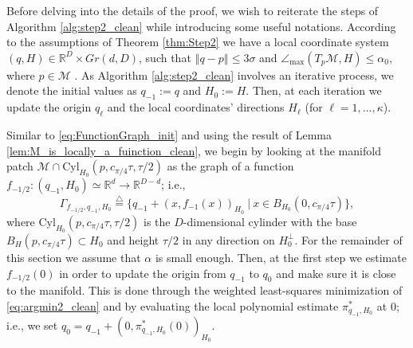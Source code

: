 \documentclass[12pt]{article}
\theoremstyle{remark}
\newcommand{\RR}{\mathbb{R}}
\newcommand{\MM}{\mathcal{M}}
\newcommand{\defeq}{\stackrel{\bigtriangleup}{=}}
\newcommand{\norm}[1]{\left\Vert #1 \right\Vert}
\begin{document}
\begin{figure}[omitted: a diagram of this paper's results, not reproduced here]\label{tikz:thm33_lemmas}\end{figure}







Before delving into the details of the proof, we wish to reiterate the steps of Algorithm \ref{alg:step2_clean} while introducing some useful notations.
According to the assumptions of Theorem \ref{thm:Step2} we have a local coordinate system $(q, H)\in \RR^D\times Gr(d, D)$, such that $ \norm{q-p} \leq 3 \sigma $ and $\angle_\textrm{max}(T_p\MM, H) \leq \alpha_0$, where $p\in \MM$ .
As Algorithm \ref{alg:step2_clean} involves an iterative process, we denote the initial values as $q_{-1} := q$ and $H_0 := H$.
Then, at each iteration we update the origin $q_\ell$ and  the local coordinates' directions $H_\ell$ (for $\ell=1, \ldots, \kappa$). 

Similar to \eqref{eq:FunctionGraph_init} and using the result of Lemma \ref{lem:M_is_locally_a_fuinction_clean}, we begin by looking at the manifold patch $\MM \cap \textrm{Cyl}_{H_0}(p,c_{\pi/4}\tau,\tau/2)$ as the graph of a function $f_{-1/2}:(q_{-1},H_0) \simeq\RR^d\to\RR^{D-d}$; i.e., 
\begin{equation}
 \Gamma_{f_{-1/2}, q_{-1},H_0} \defeq \{q_{-1} + (x, f_{-1}(x))_{H_0} ~|~ x\in B_{H_0}(0, c_{\pi/4}\tau)\}  
,\end{equation}
where $\textrm{Cyl}_{H_0}(p,c_{\pi/4}\tau, \tau/2)$ is the $D$-dimensional cylinder with the base $B_H(p, c_{\pi/4}\tau)\subset H_0$ and height $\tau/2$ in any direction on $H_0^\perp$. 
For the remainder of this section we assume that $ \alpha $ is small enough.
Then, at the first step we estimate $f_{-1/2}(0)$ in order to update the origin from $q_{-1}$ to $q_0$ and make sure it is close to the manifold. 
This is done through the weighted least-squares minimization of \eqref{eq:argmin2_clean} and by evaluating the local polynomial estimate $\pi^*_{q_{-1}, H_0}$ at $ 0 $; i.e., we set $q_0 = q_{-1} + (0,\pi^*_{q_{-1}, H_0}(0))_{H_0}$.
\end{document}
